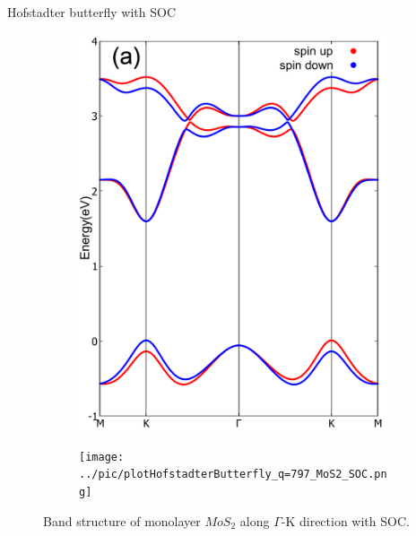 \documentclass[aspectratio=169,compress,x11names]{beamer}
\begin{document}
	\begin{frame}{Hofstadter butterfly with SOC}
		\begin{figure}
			\begin{subfigure}[b]{0.495\textwidth}
				\centering
				\includegraphics[width=0.6\linewidth]{../pic/bandstructureSOC.pdf}
			\end{subfigure}
			\hspace{-3\baselineskip}
			\begin{subfigure}[b]{0.495\textwidth}
				\centering
				\texttt{[image: ../pic/plotHofstadterButterfly\_q=797\_MoS2\_SOC.png]}
			\end{subfigure}
			\caption{Band structure of monolayer $MoS_{2}$ along $\Gamma$-K direction with SOC.}
		\end{figure}
	\end{frame}
	
\end{document}
